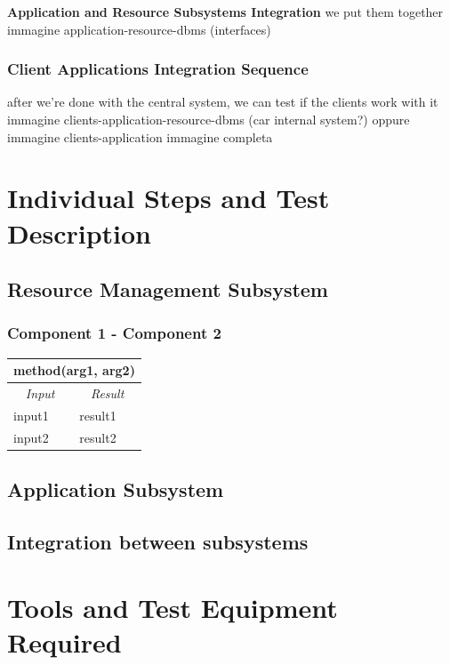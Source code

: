 \documentclass[english]{article}
\begin{document}
\textbf{Application and Resource Subsystems Integration}
we put them together
immagine application-resource-dbms (interfaces)

\subsubsection{Client Applications Integration Sequence}
after we’re done with the central system, we can test if the clients work with it
immagine clients-application-resource-dbms (car internal system?)
oppure
immagine clients-application
immagine completa



\section{Individual Steps and Test Description}

\subsection{Resource Management Subsystem}

\subsubsection{Component 1 - Component 2}

\begin{center}
	\begin{tabular}{ | m{6cm} | m{6cm} | }
		\hline 
		\multicolumn{2}{|c|}{\textbf{method(arg1, arg2)}} \\
		\hline
		\multicolumn{1}{|c|}{\textit{Input}} & \multicolumn{1}{c|}{\textit{Result}} \\
		\hline
		input1 & result1 \\
		\hline
		input2 & result2 \\
		\hline
	\end{tabular}
\end{center}

\subsection{Application Subsystem}

\subsection{Integration between subsystems}

\section{Tools and Test Equipment Required}
\end{document}
